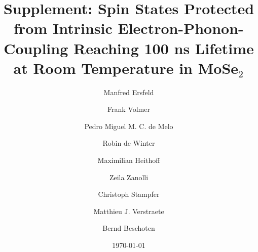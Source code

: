 \documentclass[prb,aps,superscriptaddress,reprint,floatfix]{revtex4-1}
\begin{document}
\title{Supplement: Spin States Protected from Intrinsic Electron-Phonon-Coupling Reaching 100 ns Lifetime at Room Temperature in MoSe$_2$}

\author{Manfred Ersfeld}
\affiliation{\aachenphys}
\author{Frank Volmer}
\affiliation{\aachenphys}
\author{Pedro Miguel M. C. de Melo}
\affiliation{\liege}
\affiliation{\etsf}
\author{Robin de Winter}
\affiliation{\aachenphys}
\author{Maximilian Heithoff}
\affiliation{\aachenphys}
\author{Zeila Zanolli}
\affiliation{\etsf}
\affiliation{\barcelona}
\author{Christoph Stampfer}
\affiliation{\aachenphys}
\affiliation{\pgi}
\author{Matthieu J. Verstraete}
\affiliation{\liege}
\affiliation{\etsf}
\author{Bernd Beschoten}
\affiliation{\aachenphys}







\date{\today}

\maketitle
\end{document}
